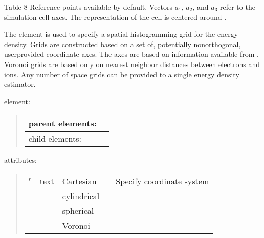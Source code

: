 \documentclass[letterpaper,10pt,english]{sphinxmanual}
\begin{document}
\begin{center}Table 8 Reference points available by default. Vectors \(a_1\), \(a_2\), and \(a_3\) refer to the simulation cell axes. The representation of the cell is centered around .
\end{center}
The  element is used to specify a spatial histogramming
grid for the energy density. Grids are constructed based on a set of,
potentially nonorthogonal, user\sphinxhyphen{}provided coordinate axes. The axes are
based on information available from . Voronoi grids
are based only on nearest neighbor distances between electrons and ions.
Any number of space grids can be provided to a single energy density
estimator.

 element:
\begin{quote}


\begin{savenotes}\sphinxattablestart
\centering
\begin{tabulary}{\linewidth}[t]{|T|T|}
\hline

parent elements:
&
\\
\hline
child elements:
&
\\
\hline
\end{tabulary}
\par
\sphinxattableend\end{savenotes}
\end{quote}

attributes:
\begin{quote}


\begin{savenotes}\sphinxattablestart
\centering
\begin{tabulary}{\linewidth}[t]{|T|T|T|T|T|}
\hline
\sphinxstyletheadfamily 
{}
&\sphinxstyletheadfamily 
{}
&\sphinxstyletheadfamily 
{}
&\sphinxstyletheadfamily 
{}
&\sphinxstyletheadfamily 
{}
\\
\hline
{}\(^r\)
&
text
&
Cartesian
&&
Specify coordinate system
\\
\hline&&
cylindrical
&&\\
\hline&&
spherical
&&\\
\hline&&
Voronoi
&&\\
\hline
\end{tabulary}
\par
\sphinxattableend\end{savenotes}
\end{quote}
\end{document}
